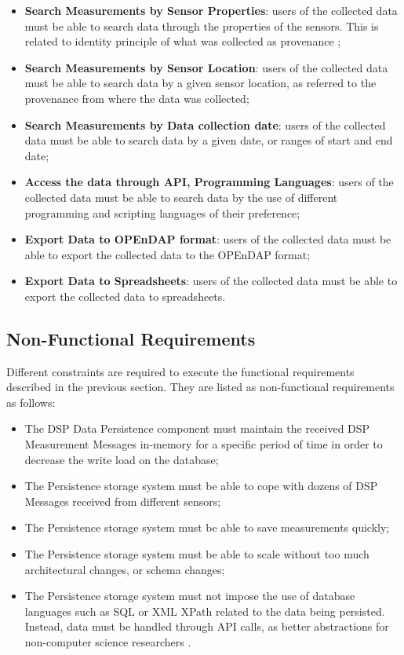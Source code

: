 \begin{itemize}
  \item \textbf{Search Measurements by Sensor Properties}: users of the
  collected data must be able to search data through the properties of the
  sensors. This is related to identity principle of what was collected
  as provenance \cite{db-provenance};
  \item \textbf{Search Measurements by Sensor Location}: users of the collected
  data must be able to search data by a given sensor location, as referred to
  the provenance from where the data was collected;
  \item \textbf{Search Measurements by Data collection date}: users of the
  collected data must be able to search data by a given date, or ranges of
  start and end date;
  \item \textbf{Access the data through API, Programming Languages}: users of the
  collected data must be able to search data by the use of different
  programming and scripting languages of their preference;
  \item \textbf{Export Data to OPEnDAP format}: users of the collected data
  must be able to export the collected data to the OPEnDAP format;
  \item \textbf{Export Data to Spreadsheets}: users of the collected data must
  be able to export the collected data to spreadsheets.
\end{itemize}

\subsection{Non-Functional Requirements}

Different constraints are required to execute the functional requirements
described in the previous section. They are listed as non-functional
requirements as follows:

\begin{itemize}
  \item The DSP Data Persistence component must maintain the received DSP
  Measurement Messages in-memory for a specific period of time in order to
  decrease the write load on the database;
  \item The Persistence storage system must be able to cope with dozens of DSP
  Messages received from different sensors;
  \item The Persistence storage system must be able to save measurements quickly;
  \item The Persistence storage system must be able to scale without too much
  architectural changes, or schema changes;
  \item The Persistence storage system must not impose the use of
  database languages such as SQL \cite{sql} or XML XPath \cite{xml-xpath}
  related to the data being persisted. Instead, data must be handled through API
  calls, as better abstractions for non-computer science researchers
  \cite{sn-programming-language}.
\end{itemize}


